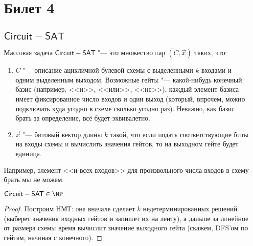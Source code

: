 \setcounter{section}{3}
\section{Билет 4}
\subsection{$\mathsf{Circuit-SAT}$}
	\begin{Def}
		Массовая задача $\mathsf{Circuit-SAT}$ "--- это множество пар $(C, \vec x)$ таких, что:
		\begin{enumerate}
			\item $C$ "--- описание ацикличной булевой схемы с выделенными $k$ входами и одним выделенным выходом.
				Возможные гейты "--- какой-нибудь конечный базис (например, <<и>>, <<или>>, <<не>>), каждый элемент
				базиса имеет фиксированное число входов и один выход (который, впрочем, можно подключать куда угодно в схеме сколько угодно раз).
				Неважно, как базис брать за определение, всё будет эквивалетно.
			\item
				$\vec x$ "--- битовый вектор длины $k$ такой, что если подать соответствующие биты на входы схемы и вычислить значения гейтов,
				то на выходном гейте будет единица.
		\end{enumerate}
	\end{Def}
	\begin{Rem}
		Например, элемент <<и всех входов>> для произвольного числа входов в схему брать мы не можем.
	\end{Rem}

	\begin{lemma}
		$\mathsf{Circuit-SAT} \in \NP$
	\end{lemma}
	\begin{proof}
		Построим НМТ: она вначале сделает $k$ недетерминированных решений (выберет значения входных гейтов и запишет их на ленту), а дальше
		за линейное от размера схемы время вычислит значение выходного гейта (скажем, DFS'ом по гейтам, начиная с конечного).
	\end{proof}

